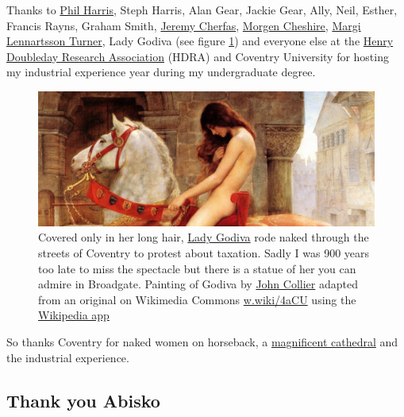 \documentclass[
]{book}
\begin{document}
Thanks to \href{https://www.coventry.ac.uk/research/research-people/professor-phil-harris/}{Phil Harris}, Steph Harris, Alan Gear, Jackie Gear, Ally, Neil, Esther, Francis Rayns, Graham Smith, \href{https://www.jeremycherfas.net/}{Jeremy Cherfas}, \href{https://cheshirenonprofitlaw.com/people/team/morgen/}{Morgen Cheshire}, \href{https://pureportal.coventry.ac.uk/en/persons/margi-lennartsson-turner}{Margi Lennartsson Turner}, Lady Godiva (see figure \ref{fig:coventry-fig}) and everyone else at the \href{https://en.wikipedia.org/wiki/Henry_Doubleday_Research_Association}{Henry Doubleday Research Association} (HDRA) and Coventry University for hosting my industrial experience year during my undergraduate degree.

\begin{figure}

{\centering \includegraphics[width=1\linewidth]{images/godiva} 

}

\caption{Covered only in her long hair, \href{https://en.wikipedia.org/wiki/Lady_Godiva}{Lady Godiva} rode naked through the streets of Coventry to protest about taxation. Sadly I was 900 years too late to miss the spectacle but there is a statue of her you can admire in Broadgate. Painting of Godiva by \href{https://en.wikipedia.org/wiki/John_Collier_(painter)}{John Collier} adapted from an original on Wikimedia Commons \href{https://w.wiki/4aCU}{w.wiki/4aCU} using the \href{https://apps.apple.com/us/app/wikipedia/id324715238}{Wikipedia app}}\label{fig:coventry-fig}
\end{figure}



So thanks Coventry for naked women on horseback, a \href{https://en.wikipedia.org/wiki/Coventry_Cathedral}{magnificent cathedral} and the industrial experience. 🙏

\hypertarget{abisko}{%
\subsection{Thank you Abisko}\label{abisko}}
\end{document}
